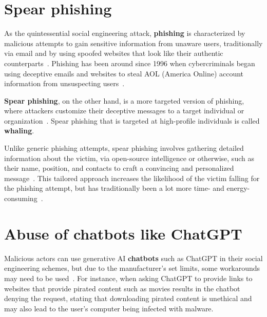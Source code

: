 \section{Spear phishing}
\begin{comment}
\end{comment}


%
%
As the quintessential social engineering attack, \textbf{phishing} is characterized by malicious attempts to gain sensitive information from unaware users, traditionally via email and by using spoofed websites that look like their authentic counterparts~\citep{basit_Comprehensive_Survey_AI_Phishing_Detection_2021}. Phishing has been around since 1996 when cybercriminals began using deceptive emails and websites to steal AOL (America Online) account information from unsuspecting users~\citep{wang_Defining_Social_Engineering_2020}.


%
%
\textbf{Spear phishing}, on the other hand, is a more targeted version of phishing, where attackers customize their deceptive messages to a target individual or organization~\citep{fakhouri_AI_Driven_Solutions_SE_Attacks_2024}. Spear phishing that is targeted at high-profile individuals is called \textbf{whaling}.


%
%
Unlike generic phishing attempts, spear phishing involves gathering detailed information about the victim, via open-source intelligence or otherwise, such as their name, position, and contacts to craft a convincing and personalized message~\citep{hadnagy_Social_Engineering_The_Science_2018}. This tailored approach increases the likelihood of the victim falling for the phishing attempt, but has traditionally been a lot more time- and energy-consuming~\cite {mirsky_Threat_Offensive_AI_Organizations_2023}.






\section{Abuse of chatbots like ChatGPT}
\begin{comment}
\end{comment}

%
%
Malicious actors can use generative AI \textbf{chatbots} such as ChatGPT in their social engineering schemes, but due to the manufacturer's set limits, some workarounds may need to be used~\citep{gupta_From_ChatGPT_to_ThreatGPT_2023}. For instance, when asking ChatGPT to provide links to websites that provide pirated content such as movies results in the chatbot denying the request, stating that downloading pirated content is unethical and may also lead to the user's computer being infected with malware.


